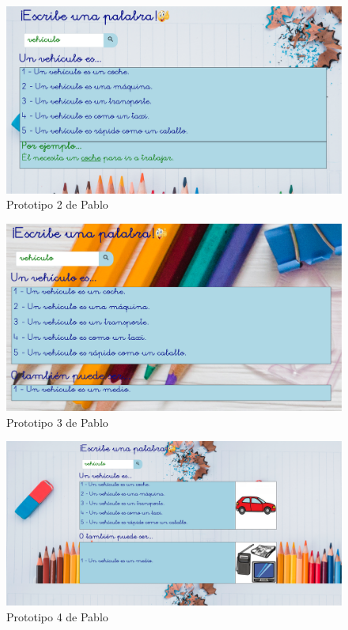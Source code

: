 \begin{figure}[!t]
	\includegraphics[width=.8\textwidth]{Imagenes/Bitmap/Mockups/mockup2_pablo}
	\centering
	\caption{Prototipo 2 de Pablo}
	\label{fig:mockup2pablo}
\end{figure}

\begin{figure}[!t]
	\includegraphics[width=.8\textwidth]{Imagenes/Bitmap/Mockups/mockup3_pablo}
	\centering
	\caption{Prototipo 3 de Pablo}
	\label{fig:mockup3pablo}
\end{figure}

\begin{figure}[!t]
	\includegraphics[width=.8\textwidth]{Imagenes/Bitmap/Mockups/mockup4_pablo}
	\centering
	\caption{Prototipo 4 de Pablo}
	\label{fig:mockup4pablo}
\end{figure}

